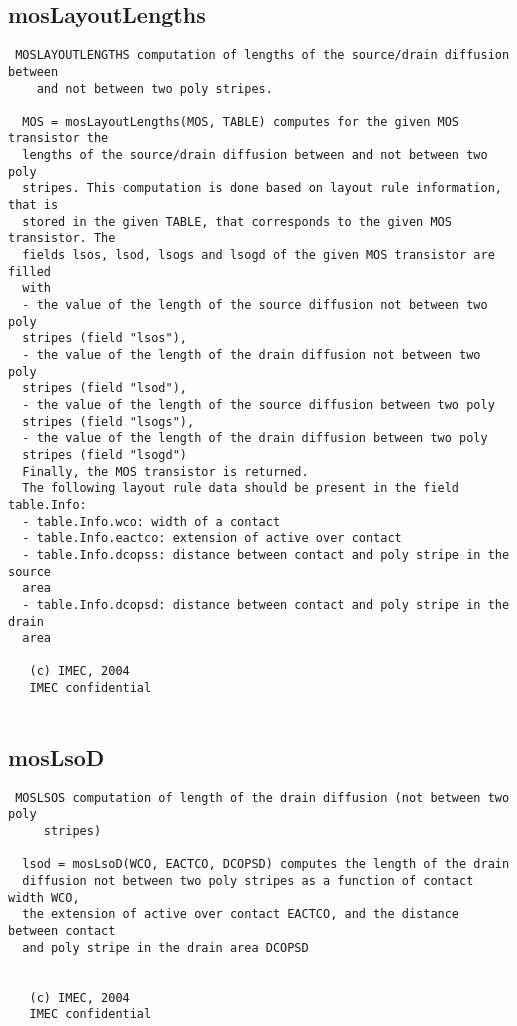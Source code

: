 \subsection{mosLayoutLengths}
\label{sec:mosLayoutLengths}
\begin{verbatim}
 MOSLAYOUTLENGTHS computation of lengths of the source/drain diffusion between
    and not between two poly stripes.
 
  MOS = mosLayoutLengths(MOS, TABLE) computes for the given MOS transistor the
  lengths of the source/drain diffusion between and not between two poly
  stripes. This computation is done based on layout rule information, that is
  stored in the given TABLE, that corresponds to the given MOS transistor. The
  fields lsos, lsod, lsogs and lsogd of the given MOS transistor are filled
  with 
  - the value of the length of the source diffusion not between two poly 
  stripes (field "lsos"), 
  - the value of the length of the drain diffusion not between two poly
  stripes (field "lsod"),
  - the value of the length of the source diffusion between two poly 
  stripes (field "lsogs"),
  - the value of the length of the drain diffusion between two poly 
  stripes (field "lsogd")
  Finally, the MOS transistor is returned.
  The following layout rule data should be present in the field table.Info:
  - table.Info.wco: width of a contact
  - table.Info.eactco: extension of active over contact
  - table.Info.dcopss: distance between contact and poly stripe in the source
  area 
  - table.Info.dcopsd: distance between contact and poly stripe in the drain
  area 
 
   (c) IMEC, 2004
   IMEC confidential 
 

\end{verbatim}

\newpage
\subsection{mosLsoD}
\label{sec:mosLsoD}
\begin{verbatim}
 MOSLSOS computation of length of the drain diffusion (not between two poly
     stripes)
 
  lsod = mosLsoD(WCO, EACTCO, DCOPSD) computes the length of the drain
  diffusion not between two poly stripes as a function of contact width WCO,
  the extension of active over contact EACTCO, and the distance between contact
  and poly stripe in the drain area DCOPSD
 
 
   (c) IMEC, 2004
   IMEC confidential 
 

\end{verbatim}

